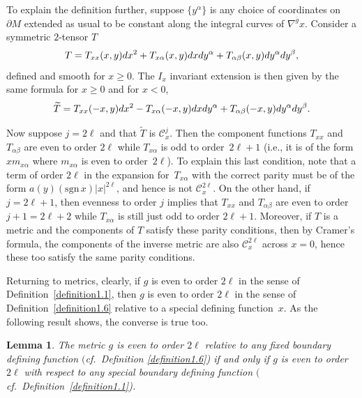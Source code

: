 \documentclass[11pt]{article}
\numberwithin{equation}{section}
\newtheorem{Lemma}[Theorem]{Lemma}
\newcommand{\calC}{\mathcal C}
\newcommand{\gbar}{\overline{g}}
\begin{document}
\noindent To explain the definition further, suppose $\{y^{\alpha}\}$ is any choice of coordinates on $\partial M$ extended as usual to be constant along the integral curves of $\nabla^{\gbar} x$. Consider a symmetric $2$-tensor $T$
\[ T= T_{xx}(x,y) {\rm d}x^2+ T_{x\alpha}(x,y) {\rm d}x {\rm d}y^{\alpha} + T_{\alpha \beta}(x,y) {\rm d}y^{\alpha} {\rm d}y^{\beta}, \]
defined and smooth for $x \geq 0$. The $I_x$ invariant extension is then given by the same formula for $x \geq 0$ and for $x < 0$,
\[ \widetilde{T} = T_{xx}(-x,y) {\rm d}x^2 - T_{x\alpha}(-x,y) {\rm d}x {\rm d}y^{\alpha} + T_{\alpha \beta}(-x,y) {\rm d}y^{\alpha} {\rm d}y^{\beta}. \]

Now suppose $j = 2\ell$ and that $\widetilde{T}$ is $\calC^{j}_x$. Then the component functions $T_{xx}$ and $T_{\alpha \beta}$ are even to order $2\ell$ while $T_{x \alpha}$ is odd to order~$2\ell+1$ (i.e., it is of the form $x m_{x\alpha}$ where $m_{x\alpha}$ is even to order~$2\ell$). To explain this last condition,
note that a term of order $2\ell$ in the expansion for~$T_{x\alpha}$ with the correct parity must be of the form
$a(y) (\mathrm{sgn}\, x) |x|^{2\ell}$, and hence is not $\calC^{2\ell}_x$. On the other hand, if $j = 2\ell+1$, then evenness to
order $j$ implies that $T_{xx}$ and $T_{\alpha \beta}$ are even to order $j+1=2\ell+2$ while $T_{x\alpha}$ is still just
odd to order $2\ell+1$. Moreover, if $T$ is a metric and the components of $T$ satisfy these parity conditions, then by Cramer's formula, the
components of the inverse metric are also $\calC^{2\ell}_x$ across $x=0$, hence these too satisfy the same parity conditions.

Returning to metrics, clearly, if $g$ is even to order $2\ell$ in the sense of Definition~\ref{definition1.1}, then $g$ is even to order $2\ell$ in the sense of Definition~\ref{definition1.6} relative to a special defining function~$x$. As the following result shows, the converse is true too.

\begin{Lemma}\label{lemma1.7} The metric $g$ is even to order $2\ell$ relative to any fixed boundary defining function $($cf.\ Definition {\rm \ref{definition1.6})} if and only if $g$ is even to order $2\ell$ with respect to any special boundary defining function $($cf.\ Definition~{\rm \ref{definition1.1})}.
\end{Lemma}
\end{document}
